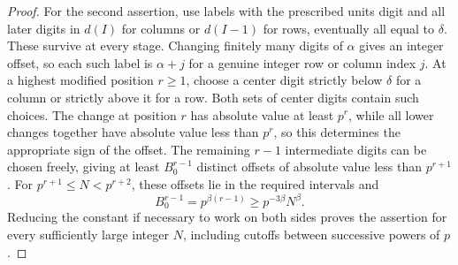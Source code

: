 \begin{proof}
For the second assertion, use labels with the prescribed units digit
and all later digits in $d(I)$ for columns or $d(I-1)$ for rows,
eventually all equal to $\delta$. These survive at every stage.
Changing finitely many digits of $\alpha$ gives an integer offset,
so each such label is $\alpha+j$ for a genuine integer row or
column index $j$. At a highest
modified position $r\ge1$, choose a center digit strictly below
$\delta$ for a column or strictly above it for a row. Both sets of
center digits contain such choices. The change at position $r$ has
absolute value at least $p^r$, while all lower changes together
have absolute value less than $p^r$, so this determines the
appropriate sign of the offset. The remaining $r-1$ intermediate digits can be
chosen freely, giving at least $B_0^{r-1}$ distinct offsets of
absolute value less than $p^{r+1}$. For $p^{r+1}\le N<p^{r+2}$,
these offsets lie in the required intervals and
\[
 B_0^{r-1}=p^{\beta(r-1)}\ge p^{-3\beta}N^\beta.
\]
Reducing the constant if necessary to work on both sides proves
the assertion for every sufficiently large integer $N$, including
cutoffs between successive powers of $p$.
\end{proof}
